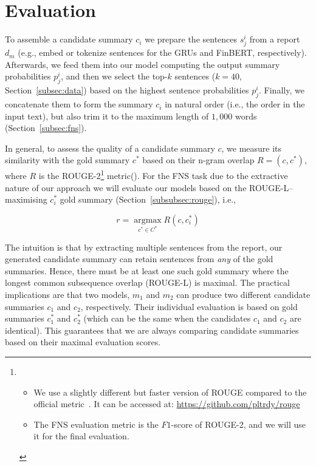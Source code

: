 \section{Evaluation}\label{sec:evaluation}

To assemble a candidate summary $c_{i}$ we prepare the sentences $s_{j}^{i}$ from a report $d_{m}$ (e.g., embed or tokenize sentences for the GRUs and FinBERT, respectively).
Afterwards, we feed them into our model computing the output summary probabilities $p_{j}^{i}$, and then we select the
top-$k$ sentences ($k=40$, Section~\ref{subsec:data}) based on the highest sentence probabilities $p_{j}^{i}$.
Finally, we concatenate them to form the summary $c_{i}$ in natural order (i.e., the order in the input text),
but also trim it to the maximum length of $1,000$ words (Section~\ref{subsec:fns}).

In general, to assess the quality of a candidate summary $c$, we measure its similarity with the gold summary $c^{*}$
based on their n-gram overlap $R=(c, c^{*})$, where $R$ is the ROUGE-2\footnote{
    \begin{itemize}
        \item We use a slightly different but faster version of ROUGE compared to the official metric~\cite{lin2004rouge}.
              It can be accessed at: \url{https://github.com/pltrdy/rouge}
        \item The FNS evaluation metric is the $F1$-score of ROUGE-2, and we will use it for the final evaluation.
    \end{itemize}
} metric(\cite{lin2004rouge}).
For the FNS task due to the extractive nature of our approach we will evaluate our models based on
the ROUGE-L--maximising $c^{*}_{i}$ gold summary (Section~\ref{subsubsec:rouge}), i.e.,

\begin{equation}\label{eq:rouge_max}
    r = \underset{c^{*} \in C^{*}}{\operatorname{argmax}} R(c, c^{*}_{i})
\end{equation}

The intuition is that by extracting multiple sentences from the report, our generated candidate summary can
retain sentences from \emph{any} of the gold summaries.
Hence, there must be at least one such gold summary where the longest common subsequence overlap (ROUGE-L) is maximal.
The practical implications are that two models, $m_{1}$ and $m_{2}$ can produce two different candidate summaries
$c_{1}$ and $c_{2}$, respectively.
Their individual evaluation is based on gold summaries $c^{*}_{1}$ and $c^{*}_{2}$ (which can be the same when the
candidates $c_{1}$ and $c_{2}$ are identical).
This guarantees that we are always comparing candidate summaries based on their maximal evaluation scores.

